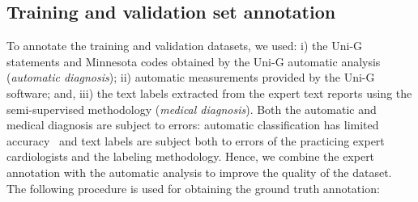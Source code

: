 \documentclass{article}
\begin{document}
\subsection{Training and validation set annotation}

To annotate the training and validation datasets, we used: i) the Uni-G statements and Minnesota codes obtained by the Uni-G automatic analysis (\textit{automatic diagnosis}); ii) automatic measurements provided by the Uni-G software; and, iii) the text labels extracted from the expert text reports using the semi-supervised methodology (\textit{medical diagnosis}). Both the automatic  and medical diagnosis are subject to errors: automatic classification has limited accuracy~\cite{willems_diagnostic_1991, shah_errors_2007, schlapfer_computerinterpreted_2017, estes_computerized_2013} and text labels are subject both to errors of the practicing expert  cardiologists and the labeling methodology. Hence, we combine the expert annotation with the automatic analysis to improve the quality of the dataset. The following procedure is used for obtaining the ground truth annotation:
\end{document}
